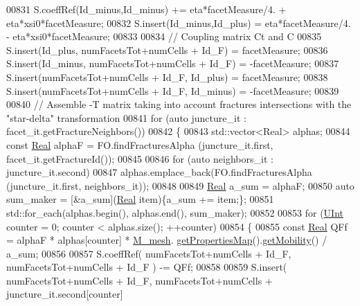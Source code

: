 \begin{DoxyCode}
00831                 S.coeffRef(Id\_minus,Id\_minus)  +=   eta*facetMeasure/4. + eta*xsi0*facetMeasure;
00832                 S.insert(Id\_minus,Id\_plus)      =   eta*facetMeasure/4. - eta*xsi0*facetMeasure;
00833                 
00834                 \textcolor{comment}{// Coupling matrix Ct and C}
00835                 S.insert(Id\_plus, numFacetsTot+numCells + Id\_F)     =  facetMeasure;
00836                 S.insert(Id\_minus, numFacetsTot+numCells + Id\_F)    = -facetMeasure;
00837                 S.insert(numFacetsTot+numCells + Id\_F, Id\_plus)     =  facetMeasure;
00838                 S.insert(numFacetsTot+numCells + Id\_F, Id\_minus)    = -facetMeasure;
00839         
00840                 \textcolor{comment}{// Assemble -T matrix taking into account fractures intersections with the "star-delta"
       transformation}
00841         \textcolor{keywordflow}{for} (\textcolor{keyword}{auto} juncture\_it : facet\_it.getFractureNeighbors())
00842         \{       
00843             std::vector<Real> alphas;
00844             \textcolor{keyword}{const} \hyperlink{namespaceFVCode3D_a40c1f5588a248569d80aa5f867080e83}{Real} alphaF = FO.findFracturesAlpha (juncture\_it.first, facet\_it.getFractureId());
00845 
00846             \textcolor{keywordflow}{for} (\textcolor{keyword}{auto} neighbors\_it : juncture\_it.second)
00847                 alphas.emplace\_back(FO.findFracturesAlpha (juncture\_it.first, neighbors\_it));
00848 
00849             \hyperlink{namespaceFVCode3D_a40c1f5588a248569d80aa5f867080e83}{Real} a\_sum = alphaF;
00850             \textcolor{keyword}{auto} sum\_maker = [&a\_sum](\hyperlink{namespaceFVCode3D_a40c1f5588a248569d80aa5f867080e83}{Real} item)\{a\_sum += item;\};
00851             std::for\_each(alphas.begin(), alphas.end(), sum\_maker);
00852 
00853             \textcolor{keywordflow}{for} (\hyperlink{namespaceFVCode3D_a4bf7e328c75d0fd504050d040ebe9eda}{UInt} counter = 0; counter < alphas.size(); ++counter)
00854             \{   
00855                 \textcolor{keyword}{const} \hyperlink{namespaceFVCode3D_a40c1f5588a248569d80aa5f867080e83}{Real} QFf = alphaF * alphas[counter] * \hyperlink{classFVCode3D_1_1global__Operator_a027911d0f801f6f19a3006329ec30a7f}{M\_mesh}.
      \hyperlink{classFVCode3D_1_1Rigid__Mesh_ab6e52fa6193e5db83fe7ccbb1c3737e8}{getPropertiesMap}().\hyperlink{classFVCode3D_1_1PropertiesMap_a810ea62ca881e4db57acd601bcea23cf}{getMobility}() / a\_sum;
00856                 
00857                 S.coeffRef( numFacetsTot+numCells + Id\_F, numFacetsTot+numCells + Id\_F ) -= QFf;
00858                 
00859                 S.insert( numFacetsTot+numCells + Id\_F, numFacetsTot+numCells + juncture\_it.second[counter]

\end{DoxyCode}
